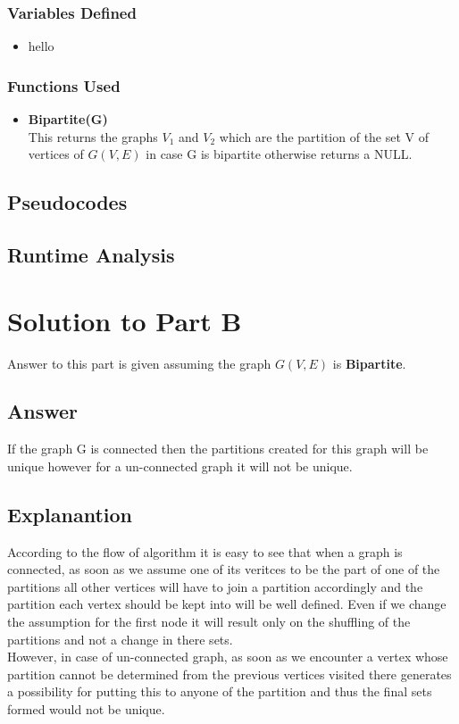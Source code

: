 \documentclass[20pt]{article}
\begin{document}
\subsubsection{Variables Defined}
\begin{itemize}
\item hello
\end{itemize}

\subsubsection{Functions Used}
\begin{itemize}
\item \textbf{Bipartite(G)} \\
This returns the graphs $V_1$ and $V_2$ which are the partition of the set V of vertices of $G(V,E)$ in case G is bipartite otherwise returns a NULL.
\end{itemize}

\newcommand\mycommfont[1]{\small\ttfamily\textcolor{blue}{#1}}

\subsection{Pseudocodes}

\subsection{Runtime Analysis}

\section{Solution to Part B}
Answer to this part is given assuming the graph $G(V,E)$ is \textbf{Bipartite}.
\subsection{Answer}
If the graph G is connected then the partitions created for this graph will be unique however for a un-connected graph it will not be unique.
\subsection{Explanantion}
According to the flow of algorithm it is easy to see that when a graph is connected, as soon as we assume one of its veritces to be the part of one of the partitions all other vertices will have to join a partition accordingly and the partition each vertex should be kept into will be well defined. Even if we change the assumption for the first node it will result only on the shuffling of the partitions and not a change in there sets. \\
However, in case of un-connected graph, as soon as we encounter a vertex whose partition cannot be determined from the previous vertices visited there generates a possibility for putting this to anyone of the partition and thus the final sets formed would not be unique.
\end{document}
